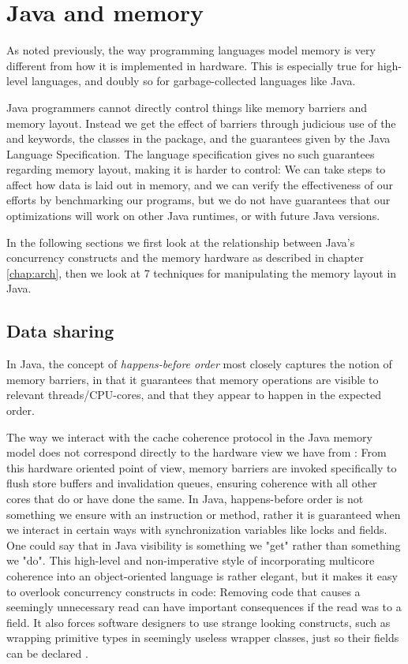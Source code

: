 \chapter{Java and memory}
\label{chap:javamem}

As noted previously, the way programming languages model memory is very
different from how it is implemented in hardware. This is especially true for
high-level languages, and doubly so for garbage-collected languages like Java.

Java programmers cannot directly control things like memory barriers and memory
layout. Instead we get the effect of barriers through judicious use of the
 and  keywords, the classes in the
 package, and the guarantees given by
the Java Language Specification\cite{javaspec}.
The language specification gives no such guarantees regarding memory
layout, making it is harder to control: We can take steps to affect how
data is laid out in memory, and we can verify the effectiveness of our efforts
by benchmarking our programs, but we do not have guarantees that our
optimizations will work on other Java runtimes, or with future Java versions.

In the following sections we first look at the relationship between Java's
concurrency constructs and the memory hardware as described in chapter
\ref{chap:arch}, then we look at 7 techniques for manipulating the memory layout
in Java.

\section{Data sharing}
In Java, the concept of \textit{happens-before order} most closely captures the
notion of memory barriers, in that it guarantees that memory operations are
visible to relevant threads/CPU-cores, and that they appear to happen in the
expected order.

The way we interact with the cache coherence protocol in the Java memory model
does not correspond directly to the hardware view we have from
\cite{mckenny-barriers}: From this hardware oriented point of view, memory
barriers are invoked specifically to flush store buffers and invalidation
queues, ensuring coherence with all other cores that do or have done the same.
In Java, happens-before order is not something we ensure with an instruction or
method, rather it is guaranteed when we interact in certain ways with
synchronization variables like locks and  fields. One could say
that in Java visibility is something we "get" rather than something we "do".
This high-level and non-imperative style of incorporating multicore coherence
into an object-oriented language is rather elegant, but it makes it easy to
overlook concurrency constructs in code: Removing code that causes a seemingly
unnecessary read can have important consequences if the read was to a
 field. It also forces software designers to use strange looking
constructs, such as wrapping primitive types in seemingly useless wrapper
classes, just so their fields can be declared .

